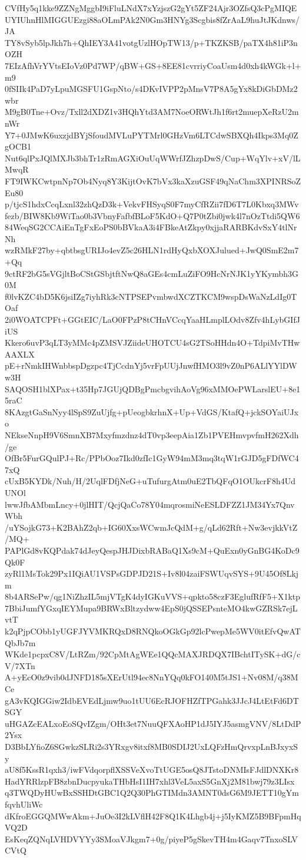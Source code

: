 CVfHy5q1kke9ZZNgMggbI9iFluLNdX7xYzjszG2gYt5ZF24Ajr3OZfsQ3cPgMIQE
UYIUhnHlMIGGUEzgi88aOLmPAk2N0Gm3HNYg3Scgbis8fZrAaL9huJtJKdnws/JA
TY8vSyb5lpJkh7h+QhIEY3A41votgUzlHOpTW13/p+TKZKSB/paTX4h81iP3nOZH
7EIzAfhVrYVtsEIoVz0Pd7WP/qBW+GS+8EE81cvrriyCoaUsm4d0xh4kWGk+l+m9
0fSIIk4PaD7yLpuMGSFU1GspNto/s4DKvIVPP2pMnsV7P8A5gYx8kDiGbDMz2wbr
M9gB0Tne+Ovz/Txll2dXDZ1v3HQhYtd3AM7NoeORWtJh1f6rt2muepXeRzU2mnWr
Y7+0JMwK6uxzjdBYjSfoudMVLuPYTMrl0GHzVm6LTCdwSBXQh4Ikps3Mq0ZgOCB1
Nut6qlPxJQlMXJb3bhTr1zRmAGXiOuUqWWrfJZhzpDwS/Cup+WqYlv+xV/lLMwqR
FT9IWKCwtpnNp7Ob4Nyq8Y3KijtOvK7bVx3kaXzuGSF49qNaChm3XPINRSoZEu80
p/tjcS1hdxCcqLxnl32zhQzD3k+VekvFHSyqS0F7myCfRZii7fD6T7L0Kbxq3MWv
fezb/BIW8Kb9WiTao0b3VbnyFafbfBLoF5KdO+Q7P0tZbi0jwk4l7nOzTtdi5QW6
84WeqSG2CCAiEnTgFxEoPS0bBVkaA3i4FBkeAtZkpy0xjjaRARBKdvSxY4tlNrNh
wzRMkF27by+qbtbsgURIJo4evZ5c26HLN1rdHyQxbXOXJulued+JwQ0SmE2m7+Qq
9ctRF2bG5sVGjltBoCStGSbjtftNwQ8aGEs4cmLuZiFO9HcNrNJK1yYKymbh3G0M
f0lvKZC4bD5K6jsiIZg7iyhRk3cNTPSEPvmbwdXCZTKCM9wspDsWaNzLdIg0TOaf
2i0WOATCPFt+GGtEIC/LaO0FPzP8tCHnVCcqYaaHLmplLOdv8Zfv4hLybGIfJiUS
Kkero6uvP3qLT3yMMc4pZMSVJZiideUHOTCU4sG2TSoHHdn4O+TdpiMvTHwAAXLX
pE+rNmkIHWnbbspDgzpc4TjCcdnYj5vrFpUUjJnwfHMO3l9vZ0nP6ALlYYlDWw3H
SAQOSH1blXPax+t35Hp7JGUjQDBgPmcbgvihAoVg96xMMOePWLarslEU+8e15raC
8KAzgtGaSnNyy4lSpS9ZuUjfg+pUeogbkrhnX+Up+VdGS/KtafQ+jckSOYaiUJxo
NEkseNnpH9V6SmnXB7Mxyfmzdnz4dT0vp3eepAia1Zb1PVEHmvpvfmH262Xdh/ge
OfBr5FurGQulPJ+Rc/PPbOoz7Ikd0zfIc1GyW94mM3mq3tqW1rGJD5gFDfWC47xQ
cUxB5KYDk/Nuh/H/2UqlFDfjNeG+uTufurgAtm0uE2TbQFqO1OUkcrF8h4UdUNOl
lwwJfbAMbmLncy+0jlHIT/QcjQaCo78Y04mqrosmiNeESLDFZZ1JM34Yx7QnvWbh
/uYSojkG73+K2BAhZ2qb+IG60XxsWCwmJcQdM+g/qLd62Rft+Nw3evjkkVtZ/MQ+
PAPlGd8vKQPdak74dJeyQespJHJDixbRABaQ1Xs9cM+QuExn0yGnBG4KoDc9Qk0F
zyRl1MsTok29Px1IQiAU1VSPsGDPJD21S+Iv8l04zaiFSWUqvSYS+9U45Of8Lkjm
8b4ARSePw/qg1NiZhzIL5mjVTgK4dyIGKuVVS+qpkto58czF3EglufRfF5+X1ktp
7BbiJumfYGxqIEYMupa9BRWxBltzydww4EpS0jQSSEPsnteMO4kwGZRSk7ejLvtT
k2qPjpCObb1yUGFJYVMKRQxD8RNQkoOGkGp92lcPwepMe5WV0itEfvQwATQbJb7m
WKde1pcpxC8V/LtRZm/92CpMtAgWEe1QQcMAXJRDQX7IBchtITySK+dG/cV/7XTn
A+yEcO0z9vib0dJNFD185sXErUtl94ec8NnYQq0kFO140M5tJS1+Nv08M/q38MCe
gA3vKQIGGiw2IdbEVEdLjmw9uo1tUU6EcRJOFHZfTPGahk3JJcJ4LtEtFd6DTSGY
uHGAZcEALxoEoSQvIZgm/OHt3et7NuuQFXAoHP1dJ5IYJ5asmgVNV/8LtDdP2Ysx
D3BbLYfioZ6SGwkzSLRi2s3YRxgv8itxf8MB0SDIJ2UxLQFzHmQrvxpLnBJxyxSy
aU8f5KssR1qxh3/iwFVdqorpflXSSVeXvoTtUGE5osQ8JTstoDNMIsFJdlDNXKr8
HadYRRlzpFB8zbnDucpyukaTHbHsI1IH7xhl3VeL5axS5GnXj2M81bwj79z3LIsx
q3TWQDyHUwBxSSHDtGBC1Q2Q30PhGTIMdn3AMNT0dsG6M9JETT10gYmfqvhUliWc
dKfroEGGQMWwAkm+JuOe3I2kLVflH42F8Q1K4Lhgb4j+j5IyKMZ5B9BFpmHqVQ2D
EsKeqZQNqLVHDVYYy3SMoaVJkgm7+0g/piyeP5gSkevTH4m4Gaqv7TnxoSLVCVtQ
